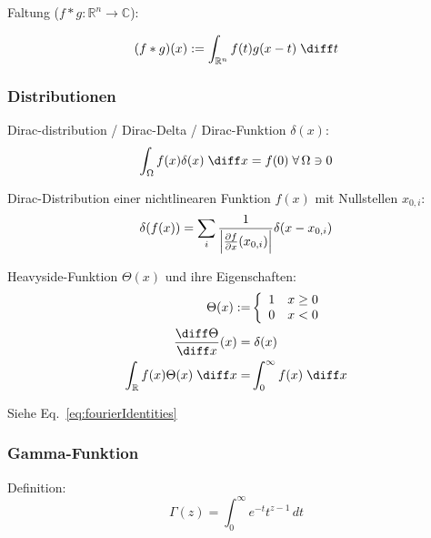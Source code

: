 \documentclass[11pt]{article}
\numberwithin{equation}{section}
\begin{document}
        Faltung ($f*g:\mathbb{R}^n \rightarrow \mathbb{C}$):

        \begin{equation}
          (f*g)(x) := \int_{\mathbb{R}^n} f(t) g(x-t)\;\diff t
        \end{equation}

      \subsubsection{Distributionen}
        Dirac-distribution / Dirac-Delta / Dirac-Funktion $\delta(x)$:
        \begin{equation}
          \int_\Omega f(x)\delta(x)\;\diff x = f(0)\;\forall\, \Omega\ni 0
        \end{equation}

        Dirac-Distribution einer nichtlinearen Funktion $f(x)$ mit Nullstellen $x_{0,i}$:
        \begin{equation}
          \delta(f(x)) = \sum_i \frac{1}{\left|\frac{\partial f}{\partial x}(x_{0,i})\right|}\delta(x-x_{0,i})
        \end{equation}

        Heavyside-Funktion $\Theta(x)$ und ihre Eigenschaften:
        \begin{equation}
          \begin{aligned}
            \Theta(x) :=& \left\{\begin{array}{ll}
                1 & x\ge 0 \\
                0 & x<0 \\
              \end{array}\right. \\
              \tder{\Theta}{x}(x) =&\; \delta(x) \\
              \int_{\mathbb{R}} f(x)\Theta(x)\;\diff x =& \int_{0}^{\infty} f(x)\;\diff x
            \end{aligned}
        \end{equation}

        Siehe Eq.~\ref{eq:fourierIdentities}

  		\subsubsection{Gamma-Funktion}
    			Definition:
    			\begin{equation}
    				\Gamma(z)=\int_0^{\infty}e^{-t}t^{z-1}\,dt
    			\end{equation}
\end{document}
